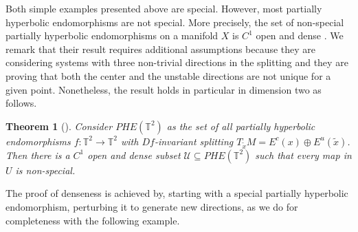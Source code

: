 \documentclass[a4paper,11pt,reqno]{amsart}
\newcommand{\TT}{{\mathbb{T}^2}}
\newtheorem{theorem}{Theorem}[section]
\theoremstyle{definition}
\begin{document}
Both simple examples presented above are special. However, most partially hyperbolic endomorphisms are not special. More precisely, the set of non-special partially hyperbolic endomorphisms on a manifold $X$ is $C^1$ open and dense \cite[Theorem B]{CostaMicena2022}. We remark that their result requires additional assumptions because they are considering systems with three non-trivial directions in the splitting and they are proving that both the center and the unstable directions are not unique for a given point. Nonetheless, the result holds in particular in dimension two as follows.

\begin{theorem}[\cite{CostaMicena2022}]
    Consider $PHE(\TT)$ as the set of all partially hyperbolic endomorphisms $f: \TT \to \TT$ with $Df$-invariant splitting $T_{\tilde{x}}M = E^c(x) \oplus E^u(\tilde{x})$. Then there is a $C^1$ open and dense subset $\mathcal{U} \subseteq PHE(\TT)$ such that every map in $U$ is non-special.
\end{theorem}

The proof of denseness is achieved by, starting with a special partially hyperbolic endomorphism, perturbing it to generate new directions, as we do for completeness with the following example.
\end{document}
